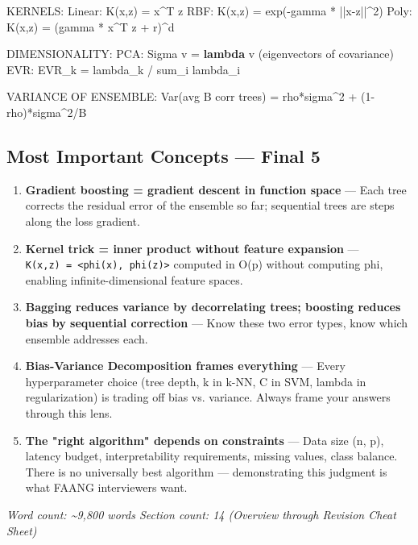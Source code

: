 \documentclass[11pt]{article}
\newenvironment{Shaded}{\begin{snugshade}}{\end{snugshade}}
\newcommand{\DecValTok}[1]{\textcolor[rgb]{0.96,0.45,0.00}{#1}}
\newcommand{\KeywordTok}[1]{\textcolor[rgb]{0.81,0.81,0.76}{\textbf{#1}}}
\newcommand{\NormalTok}[1]{\textcolor[rgb]{0.81,0.81,0.76}{#1}}
\newcommand{\OperatorTok}[1]{\textcolor[rgb]{0.81,0.81,0.76}{#1}}
\begin{document}
\begin{Shaded}
\begin{Highlighting}[]
\NormalTok{KERNELS:}
\NormalTok{Linear:   K(x,z) }\OperatorTok{=}\NormalTok{ x}\OperatorTok{\^{}}\NormalTok{T z}
\NormalTok{RBF:      K(x,z) }\OperatorTok{=}\NormalTok{ exp(}\OperatorTok{{-}}\NormalTok{gamma }\OperatorTok{*} \OperatorTok{||}\NormalTok{x}\OperatorTok{{-}}\NormalTok{z}\OperatorTok{||\^{}}\DecValTok{2}\NormalTok{)}
\NormalTok{Poly:     K(x,z) }\OperatorTok{=}\NormalTok{ (gamma }\OperatorTok{*}\NormalTok{ x}\OperatorTok{\^{}}\NormalTok{T z }\OperatorTok{+}\NormalTok{ r)}\OperatorTok{\^{}}\NormalTok{d}

\NormalTok{DIMENSIONALITY:}
\NormalTok{PCA:      Sigma v }\OperatorTok{=} \KeywordTok{lambda}\NormalTok{ v    (eigenvectors of covariance)}
\NormalTok{EVR:      EVR\_k }\OperatorTok{=}\NormalTok{ lambda\_k }\OperatorTok{/}\NormalTok{ sum\_i lambda\_i}

\NormalTok{VARIANCE OF ENSEMBLE:}
\NormalTok{Var(avg B corr trees) }\OperatorTok{=}\NormalTok{ rho}\OperatorTok{*}\NormalTok{sigma}\OperatorTok{\^{}}\DecValTok{2} \OperatorTok{+}\NormalTok{ (}\DecValTok{1}\OperatorTok{{-}}\NormalTok{rho)}\OperatorTok{*}\NormalTok{sigma}\OperatorTok{\^{}}\DecValTok{2}\OperatorTok{/}\NormalTok{B}
\end{Highlighting}
\end{Shaded}

\subsection{Most Important Concepts --- Final 5}\label{most-important-concepts--final-5}

\begin{enumerate}
\def\labelenumi{\arabic{enumi}.}
\item
  \textbf{Gradient boosting = gradient descent in function space} --- Each tree corrects the residual error of the ensemble so far; sequential trees are steps along the loss gradient.
\item
  \textbf{Kernel trick = inner product without feature expansion} --- \texttt{K(x,z)\ =\ \textless{}phi(x),\ phi(z)\textgreater{}} computed in O(p) without computing phi, enabling infinite-dimensional feature spaces.
\item
  \textbf{Bagging reduces variance by decorrelating trees; boosting reduces bias by sequential correction} --- Know these two error types, know which ensemble addresses each.
\item
  \textbf{Bias-Variance Decomposition frames everything} --- Every hyperparameter choice (tree depth, k in k-NN, C in SVM, lambda in regularization) is trading off bias vs. variance. Always frame your answers through this lens.
\item
  \textbf{The "right algorithm" depends on constraints} --- Data size (n, p), latency budget, interpretability requirements, missing values, class balance. There is no universally best algorithm --- demonstrating this judgment is what FAANG interviewers want.
\end{enumerate}

\emph{Word count: \textasciitilde9,800 words \textbar{} Section count: 14 (Overview through Revision Cheat Sheet)}
\end{document}
